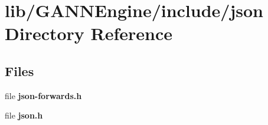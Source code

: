 \section{lib/\+G\+A\+N\+N\+Engine/include/json Directory Reference}
\label{dir_1ae53cecc8e956f6eadd3ba8fe8c024f}
\subsection*{Files}
\begin{DoxyCompactItemize}
\item 
file {\bfseries json-\/forwards.\+h}
\item 
file {\bfseries json.\+h}
\end{DoxyCompactItemize}
